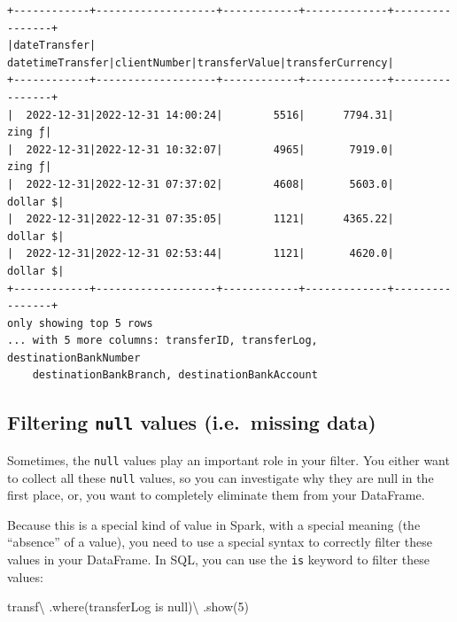 \documentclass[
  11pt,
  letterpaper,
  DIV=11,
  numbers=noendperiod]{scrreprt}
\newenvironment{Shaded}{\begin{snugshade}}{\end{snugshade}}
\newcommand{\DecValTok}[1]{\textcolor[rgb]{0.68,0.00,0.00}{#1}}
\newcommand{\NormalTok}[1]{\textcolor[rgb]{0.00,0.23,0.31}{#1}}
\newcommand{\OperatorTok}[1]{\textcolor[rgb]{0.37,0.37,0.37}{#1}}
\newcommand{\StringTok}[1]{\textcolor[rgb]{0.13,0.47,0.30}{#1}}
\begin{document}
\begin{verbatim}
+------------+-------------------+------------+-------------+----------------+
|dateTransfer|   datetimeTransfer|clientNumber|transferValue|transferCurrency|
+------------+-------------------+------------+-------------+----------------+
|  2022-12-31|2022-12-31 14:00:24|        5516|      7794.31|          zing ƒ|
|  2022-12-31|2022-12-31 10:32:07|        4965|       7919.0|          zing ƒ|
|  2022-12-31|2022-12-31 07:37:02|        4608|       5603.0|        dollar $|
|  2022-12-31|2022-12-31 07:35:05|        1121|      4365.22|        dollar $|
|  2022-12-31|2022-12-31 02:53:44|        1121|       4620.0|        dollar $|
+------------+-------------------+------------+-------------+----------------+
only showing top 5 rows
... with 5 more columns: transferID, transferLog, destinationBankNumber
    destinationBankBranch, destinationBankAccount
\end{verbatim}

\hypertarget{filtering-null-values-i.e.-missing-data}{%
\subsection{\texorpdfstring{Filtering \texttt{null} values (i.e.~missing
data)}{Filtering null values (i.e.~missing data)}}\label{filtering-null-values-i.e.-missing-data}}

Sometimes, the \texttt{null} values play an important role in your
filter. You either want to collect all these \texttt{null} values, so
you can investigate why they are null in the first place, or, you want
to completely eliminate them from your DataFrame.

Because this is a special kind of value in Spark, with a special meaning
(the ``absence'' of a value), you need to use a special syntax to
correctly filter these values in your DataFrame. In SQL, you can use the
\texttt{is} keyword to filter these values:

\begin{Shaded}
\begin{Highlighting}[]
\NormalTok{transf}\OperatorTok{\textbackslash{}}
\NormalTok{  .where(}\StringTok{\textquotesingle{}transferLog is null\textquotesingle{}}\NormalTok{)}\OperatorTok{\textbackslash{}}
\NormalTok{  .show(}\DecValTok{5}\NormalTok{)}
\end{Highlighting}
\end{Shaded}
\end{document}
